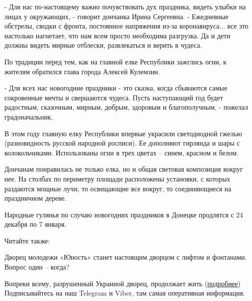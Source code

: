 \begin{multicols}{2} %
\setlength{\parindent}{0pt}


- Для нас по-настоящему важно почувствовать дух праздника, видеть улыбки на
лицах у окружающих, - говорит дончанка Ирина Сергеевна. - Ежедневные обстрелы,
сводки с фронта, постоянное напряжения из-за коронавируса... все это настолько
нагнетает, что нам всем просто необходима разгрузка. Да и дети должны видеть
мирные отблески, развлекаться и верить в чудеса.

По традиции перед тем, как на главной елке Республики зажглись огни, к жителям
обратился глава города Алексей Кулемзин.

- Для всех нас новогодние праздники - это сказка, когда сбываются самые
сокровенные мечты и свершаются чудеса. Пусть наступающий год будет радостным,
сказочным, мирным, добрым, здоровым и благополучным, - пожелал градоначальник.

В этом году главную елку Республики впервые украсили светодиодной гжелью
(разновидность русской народной росписи). Ее дополняют гирлянда и шары с
колокольчиками. Использованы огни в трех цветах – синем, красном и белом.

\end{multicols} %


Дончанам понравилась не только елка, но и общая световая композиция вокруг нее.
На столбах по периметру площади расположены установки, с которых раздаются
мощные лучи, то освещающие все вокруг, то соединяющиеся на праздничном дереве.

Народные гулянья по случаю новогодних праздников в Донецке продлятся с 24
декабря по 7 января.


Читайте также:

Дворец молодежи «Юность» станет настоящим дворцом с лифтом и фонтанами. Вопрос
один – когда?

Вопреки всему, разрушенный Украиной дворец, продолжает жить (\href{https://www.donetsk.kp.ru/daily/28374.5/4523761}{подробнее})
Подписывайтесь на наш Telegram и Viber, там самая оперативная информация.
